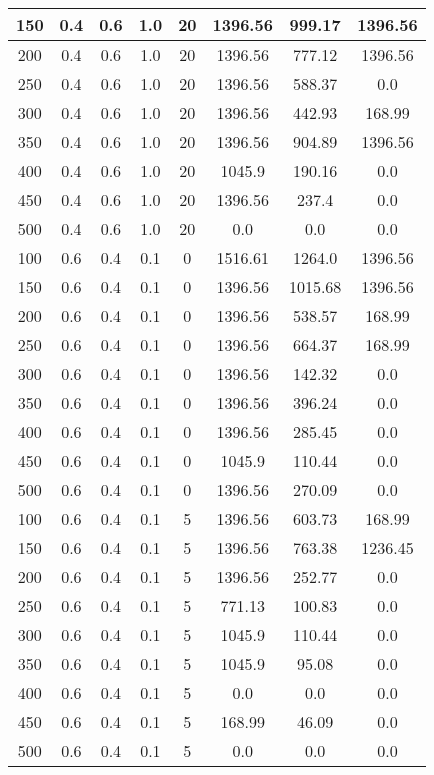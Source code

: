 \documentclass[a4paper, 12pt]{extreport}
\begin{document}
\begin{itemize}
\begin{longtable}{|c|c|c|c|c|c|c|c|}
			150 & 0.4 & 0.6 & 1.0 & 20 & 1396.56 & 999.17 & 1396.56 \\\hline
			200 & 0.4 & 0.6 & 1.0 & 20 & 1396.56 & 777.12 & 1396.56 \\\hline
			250 & 0.4 & 0.6 & 1.0 & 20 & 1396.56 & 588.37 & 0.0 \\\hline
			300 & 0.4 & 0.6 & 1.0 & 20 & 1396.56 & 442.93 & 168.99 \\\hline
			350 & 0.4 & 0.6 & 1.0 & 20 & 1396.56 & 904.89 & 1396.56 \\\hline
			400 & 0.4 & 0.6 & 1.0 & 20 & 1045.9 & 190.16 & 0.0 \\\hline
			450 & 0.4 & 0.6 & 1.0 & 20 & 1396.56 & 237.4 & 0.0 \\\hline
			500 & 0.4 & 0.6 & 1.0 & 20 & 0.0 & 0.0 & 0.0 \\\hline
			100 & 0.6 & 0.4 & 0.1 & 0 & 1516.61 & 1264.0 & 1396.56 \\\hline
			150 & 0.6 & 0.4 & 0.1 & 0 & 1396.56 & 1015.68 & 1396.56 \\\hline
			200 & 0.6 & 0.4 & 0.1 & 0 & 1396.56 & 538.57 & 168.99 \\\hline
			250 & 0.6 & 0.4 & 0.1 & 0 & 1396.56 & 664.37 & 168.99 \\\hline
			300 & 0.6 & 0.4 & 0.1 & 0 & 1396.56 & 142.32 & 0.0 \\\hline
			350 & 0.6 & 0.4 & 0.1 & 0 & 1396.56 & 396.24 & 0.0 \\\hline
			400 & 0.6 & 0.4 & 0.1 & 0 & 1396.56 & 285.45 & 0.0 \\\hline
			450 & 0.6 & 0.4 & 0.1 & 0 & 1045.9 & 110.44 & 0.0 \\\hline
			500 & 0.6 & 0.4 & 0.1 & 0 & 1396.56 & 270.09 & 0.0 \\\hline
			100 & 0.6 & 0.4 & 0.1 & 5 & 1396.56 & 603.73 & 168.99 \\\hline
			150 & 0.6 & 0.4 & 0.1 & 5 & 1396.56 & 763.38 & 1236.45 \\\hline
			200 & 0.6 & 0.4 & 0.1 & 5 & 1396.56 & 252.77 & 0.0 \\\hline
			250 & 0.6 & 0.4 & 0.1 & 5 & 771.13 & 100.83 & 0.0 \\\hline
			300 & 0.6 & 0.4 & 0.1 & 5 & 1045.9 & 110.44 & 0.0 \\\hline
			350 & 0.6 & 0.4 & 0.1 & 5 & 1045.9 & 95.08 & 0.0 \\\hline
			400 & 0.6 & 0.4 & 0.1 & 5 & 0.0 & 0.0 & 0.0 \\\hline
			450 & 0.6 & 0.4 & 0.1 & 5 & 168.99 & 46.09 & 0.0 \\\hline
			500 & 0.6 & 0.4 & 0.1 & 5 & 0.0 & 0.0 & 0.0 \\\hline

\end{longtable}
\end{itemize}
\end{document}
